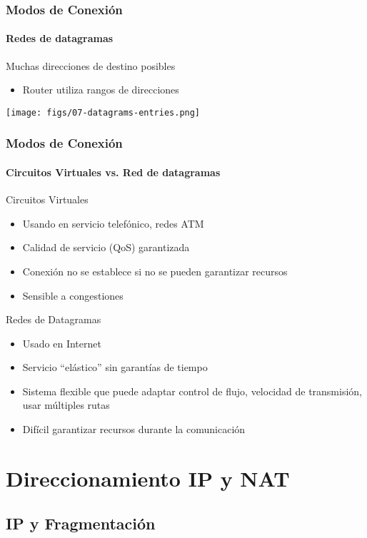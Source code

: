 \documentclass[letter]{beamer}
\begin{document}
\begin{frame}
  \frametitle{Modos de Conexión}
  \framesubtitle{Redes de datagramas}

  Muchas direcciones de destino posibles
  \begin{itemize}
    \item Router utiliza rangos de direcciones
  \end{itemize}
  
  \begin{center}
    \texttt{[image: figs/07-datagrams-entries.png]}
  \end{center}

\end{frame}

\begin{frame}
  \frametitle{Modos de Conexión}
  \framesubtitle{Circuitos Virtuales vs. Red de datagramas}

  Circuitos Virtuales
  \begin{itemize}
    \item Usando en servicio telefónico, redes ATM
    \item Calidad de servicio (QoS) garantizada
    \item Conexión no se establece si no se pueden garantizar recursos
    \item Sensible a congestiones
  \end{itemize}
  Redes de Datagramas
  \begin{itemize}
    \item Usado en Internet
    \item Servicio ``elástico'' sin garantías de tiempo
    \item Sistema flexible que puede adaptar control de flujo, velocidad de transmisión, usar múltiples rutas
    \item Difícil garantizar recursos durante la comunicación
  \end{itemize}

\end{frame}

\section{Direccionamiento IP y NAT}

\subsection{IP y Fragmentación}
\end{document}
